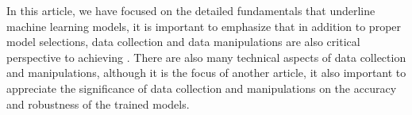 
\par
In this article, we have focused on the detailed fundamentals that underline machine learning models, it is important to emphasize that in addition to proper model selections, data collection and data manipulations are also critical perspective to achieving . There are also many technical aspects of data collection and manipulations, although it is the focus of another article, it also important to appreciate the significance of data collection and manipulations on the accuracy and robustness of the trained models.
\par 
